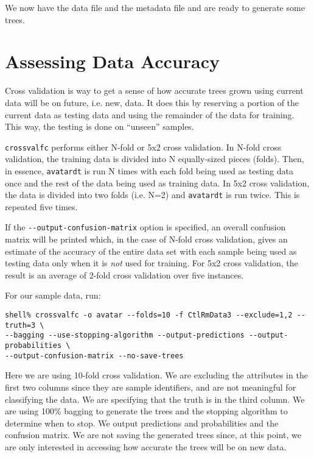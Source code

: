\documentclass{article}
\begin{document}
We now have the data file and the metadata file and are ready to generate some trees.

\section{Assessing Data Accuracy}

Cross validation is way to get a sense of how accurate trees grown using current data will be on future,
i.e. new, data. It does this by reserving a portion of the current data as testing data and using 
the remainder of the data for training.
This way, the testing is done on ``unseen'' samples.

\verb=crossvalfc= performs either N-fold or 5x2 cross validation. In N-fold cross validation, the
training data is divided into N equally-sized pieces (folds). Then, in essence, \verb=avatardt=
is run N times with each fold being used as testing data once and the rest of the data being
used as training data. In 5x2 cross validation, the data is divided into two folds (i.e. N=2) and \verb=avatardt=
is run twice. This is repeated five times.

If the \verb=--output-confusion-matrix= option is specified, an overall
confusion matrix will be printed which, in the case of N-fold cross validation, gives an estimate
of the accuracy of the entire data set with each sample being used as testing data only when it is \emph{not}
used for training. For 5x2 cross validation, the result is an average of 2-fold cross validation over
five instances.

For our sample data, run:

\begin{verbatim}
shell% crossvalfc -o avatar --folds=10 -f CtlRmData3 --exclude=1,2 --truth=3 \
--bagging --use-stopping-algorithm --output-predictions --output-probabilities \
--output-confusion-matrix --no-save-trees
\end{verbatim}

Here we are using 10-fold cross validation. We are excluding the attributes in the first two columns since
they are sample identifiers, and are not meaningful for classifying the data. We are specifying that the truth is in
the third column. We are using 100\% bagging to generate the trees and the stopping algorithm to
determine when to stop. We output predictions and probabilities and the confusion matrix. We are
not saving the generated trees since, at this point, we are only interested in accessing how accurate
the trees will be on new data.
\end{document}
